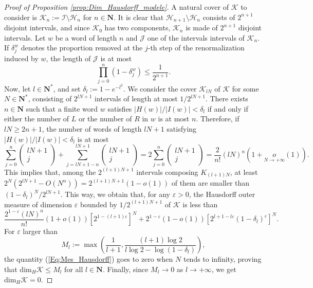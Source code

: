 \documentclass[11pt]{article}
\newcommand{\littleo}[1]{\underset{#1}{o}}
\begin{document}
\begin{proof}[Proof of Proposition \ref{prop:Dim_Hausdorff_modele}]
    A natural cover of $\mathcal{K}$ to consider is $\mathcal{K}_{n}:=\mathcal{I}\setminus\mathcal{H}_{n}$ for $n\in\mathbf{N}$. It is clear that $\mathcal{H}_{n+1}\setminus\mathcal{H}_{n}$ consists of $2^{n+1}$ disjoint intervals, and since $\mathcal{K}_{0}$ has two components, $\mathcal{K}_{n}$ is made of $2^{n+1}$ disjoint intervals. Let $w$ be a word of length $n$ and $\mathcal{J}$ one of the intervals intervals of $\mathcal{K}_{n}$. If $\delta_{j}^{w}$ denotes the proportion removed at the $j$-th step of the renormalization induced by $w$, the length of $\mathcal{J}$ is at most
    \[
    \prod_{j=0}^{n}(1-\delta_{j}^{w})\leq\frac{1}{2^{n+1}}.
    \]
    Now, let $l\in\mathbf{N}^{*}$, and set $\delta_{l}:=1-e^{-l^{2}}$. We consider the cover $\mathcal{K}_{lN}$ of $\mathcal{K}$ for some $N\in\mathbf{N}^{*}$, consisting of $2^{lN+1}$ intervals of length at most $1/2^{lN+1}$. There exists $n\in\mathbf{N}$ such that a finite word $w$ satisfies $\lvert H\left(w\right)\rvert/\lvert I\left(w\right)\rvert<\delta_{l}$ if and only if either the number of $L$ or the number of $R$ in $w$ is at most $n$. Therefore, if $lN\geq2n+1$, the number of words of length $lN+1$ satisfying $\lvert H\left(w\right)\rvert/\lvert I\left(w\right)\rvert<\delta_{l}$ is at most
    \[
    \sum_{j=0}^{n}\left(
    \begin{array}{c}
        lN+1 \\
        j 
    \end{array}\right)
    +\sum_{j=lN+1-n}^{lN+1}\left(
    \begin{array}{c}
        lN+1 \\
        j 
    \end{array}\right)
    =2\sum_{j=0}^{n}\left(
    \begin{array}{c}
        lN+1 \\
        j 
    \end{array}\right)=\frac{2}{n!}(lN)^{n}(1+\littleo{N\rightarrow+\infty}(1)).
    \]
    This implies that, among the $2^{(l+1)N+1}$ intervals composing $K_{(l+1)N}$, at least $2^{N}(2^{lN+1}-O(N^{n}))=2^{(l+1)N+1}(1-o(1))$ of them are smaller than $(1-\delta_{l})^{N}/2^{lN+1}$. This way, we obtain that, for any $\varepsilon>0$, the Hausdorff outer measure of dimension $\varepsilon$ bounded by $1/2^{(l+1)N+1}$ of $\mathcal{K}$ is less than
    \begin{equation}
    \label{Eq:Mes_Hausdorff}
      \frac{2^{1-\varepsilon}(lN)^{n}}{n!}(1+o(1))\left[2^{1-(l+1)\varepsilon}\right]^{N}+2^{1-\varepsilon}(1-o(1))\left[2^{l+1-l\varepsilon}(1-\delta_{l})^{\varepsilon}\right]^{N}.  
    \end{equation}
    For $\varepsilon$ larger than
    \[
    M_{l}:=\max\left(\frac{1}{l+1},\frac{(l+1)\log2}{l\log2-\log(1-\delta_{l})}\right),
    \]
    the quantity (\ref{Eq:Mes_Hausdorff}) goes to zero when $N$ tends to infinity, proving that $\text{dim}_{H}\mathcal{K}\leq M_{l}$ for all $l\in\mathbf{N}$. Finally, since $M_{l}\rightarrow0$ as $l\rightarrow+\infty$, we get $\text{dim}_{H}\mathcal{K}=0$.
\end{proof}
\end{document}
